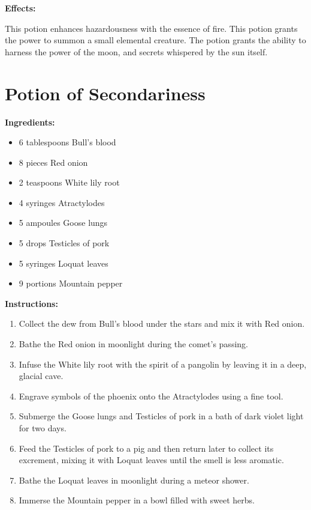 \documentclass{article}
\begin{document}
\textbf{Effects:}

This potion enhances hazardousness with the essence of fire. This potion grants the power to summon a small elemental creature. The potion grants the ability to harness the power of the moon, and secrets whispered by the sun itself.

\newpage
\section*{Potion of Secondariness}

\textbf{Ingredients:}

\begin{itemize}
  \item 6 tablespoons Bull's blood
  \item 8 pieces Red onion
  \item 2 teaspoons White lily root
  \item 4 syringes Atractylodes
  \item 5 ampoules Goose lungs
  \item 5 drops Testicles of pork
  \item 5 syringes Loquat leaves
  \item 9 portions Mountain pepper
\end{itemize}

\textbf{Instructions:}

\begin{enumerate}
  \item Collect the dew from Bull's blood under the stars and mix it with Red onion.
  \item Bathe the Red onion in moonlight during the comet’s passing.
  \item Infuse the White lily root with the spirit of a pangolin by leaving it in a deep, glacial cave.
  \item Engrave symbols of the phoenix onto the Atractylodes using a fine tool.
  \item Submerge the Goose lungs and Testicles of pork in a bath of dark violet light for two days.
  \item Feed the Testicles of pork to a pig and then return later to collect its excrement, mixing it with Loquat leaves until the smell is less aromatic.
  \item Bathe the Loquat leaves in moonlight during a meteor shower.
  \item Immerse the Mountain pepper in a bowl filled with sweet herbs.
\end{enumerate}
\end{document}
